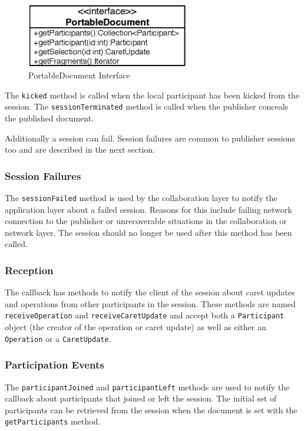 \begin{figure}[H]
 \centering
 \includegraphics[width=7.09cm,height=2.79cm]{../images/finalreport/architecture_portabledocument_uml.eps}
 \caption{PortableDocument Interface}
\end{figure}

The \texttt{kicked} method is called when the local participant
has been kicked from the session. The \texttt{sessionTerminated}
method is called when the publisher conceals the published document. 

Additionally a session can fail. Session failures are common to publisher
sessions too and are described in the next section.


\subsubsection{Session Failures}
\label{sect:archoverview.sessionfailure}
The \texttt{sessionFailed}
method is used by the collaboration layer to notify the application layer
about a failed session. Reasons for this include failing network connection
to the publisher or unrecoverable situations in the collaboration or network
layer. The session should no longer be used after this method has been
called.


\subsubsection{Reception}
The callback has methods to notify the client of the session about caret
updates and operations from other participants in the session. These methods
are named \texttt{receive\-Operation} and \texttt{receive\-Caret\-Update}
and accept both a \texttt{Participant} object (the creator of the operation
or caret update)
as well as either an \texttt{Operation} or a \texttt{Caret\-Update}.


\subsubsection{Participation Events}
The \texttt{participant\-Joined} and \texttt{participant\-Left} methods
are used to notify the callback about
participants that joined or left the session. The initial set of participants
can be retrieved from the session when the document is set with
the \texttt{get\-Participants} method.


